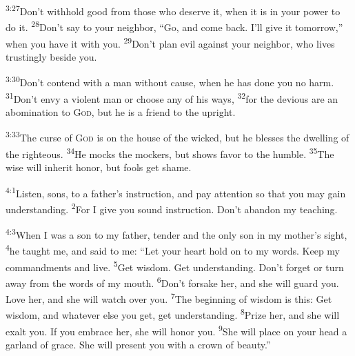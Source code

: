 \documentclass[openany,12pt,english]{book}
\newenvironment{para}{\par\pretolerance=100\tolerance=200\setlength{\emergencystretch}{0.6em}\relax}{\par}
\begin{document}
\begin{para}
    \textsuperscript{3:27}\thinspace{}Don't with\-hold good from those who de\-serve it, when it is in your pow\-er to do it.
    \textsuperscript{28}\thinspace{}Don't say to your neigh\-bor, “Go, and come back. I'll give it to\-mor\-row,” when you have it with you.
    \textsuperscript{29}\thinspace{}Don't plan evil against your neigh\-bor, who lives trustingly be\-side you.
\end{para}

\begin{para}
    \textsuperscript{3:30}\thinspace{}Don't con\-tend with a man with\-out cause, when he has done you no harm.
    \textsuperscript{31}\thinspace{}Don't en\-vy a vi\-o\-lent man or choose any of his ways,
    \textsuperscript{32}\thinspace{}for the de\-vi\-ous are an a\-bom\-i\-na\-tion to \textsc{God}, but he is a friend to the up\-right.
\end{para}

\begin{para}
    \textsuperscript{3:33}\thinspace{}The curse of \textsc{God} is on the house of the wick\-ed, but he blesses the dwell\-ing of the right\-eous.
    \textsuperscript{34}\thinspace{}He mocks the mock\-ers, but shows fa\-vor to the hum\-ble.
    \textsuperscript{35}\thinspace{}The wise will in\-her\-it hon\-or, but fools get shame.
\end{para}

\bigskip{}

\begin{para}
    \textsuperscript{4:1}\thinspace{}Lis\-ten, sons, to a father's in\-struc\-tion, and pay at\-ten\-tion so that you may gain un\-der\-stand\-ing.
    \textsuperscript{2}\thinspace{}For I give you sound in\-struc\-tion. Don't a\-ban\-don my teach\-ing.
\end{para}

\begin{para}
    \textsuperscript{4:3}\thinspace{}When I was a son to my fa\-ther, ten\-der and the on\-ly son in my mother's sight,
    \textsuperscript{4}\thinspace{}he taught me, and said to me: “Let your heart hold on to my words. Keep my commandments and live.
    \textsuperscript{5}\thinspace{}Get wis\-dom. Get un\-der\-stand\-ing. Don't for\-get or turn a\-way from the words of my mouth.
    \textsuperscript{6}\thinspace{}Don't for\-sake her, and she will guard you. Love her, and she will watch over you.
    \textsuperscript{7}\thinspace{}The be\-gin\-ning of wis\-dom is this: Get wis\-dom, and what\-ev\-er else you get, get un\-der\-stand\-ing.
    \textsuperscript{8}\thinspace{}Prize her, and she will ex\-alt you. If you em\-brace her, she will hon\-or you.
    \textsuperscript{9}\thinspace{}She will place on your head a gar\-land of grace. She will pres\-ent you with a crown of beau\-ty.”
\end{para}
\end{document}
